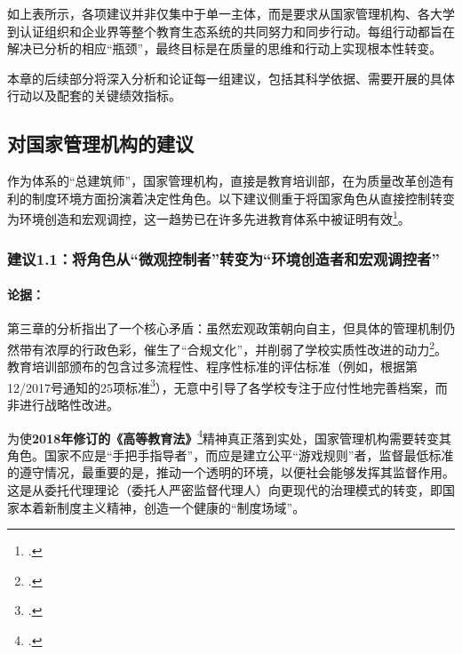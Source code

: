 \vspace{0.5cm}

如上表所示，各项建议并非仅集中于单一主体，而是要求从国家管理机构、各大学到认证组织和企业界等整个教育生态系统的共同努力和同步行动。每组行动都旨在解决已分析的相应“瓶颈”，最终目标是在质量的思维和行动上实现根本性转变。

本章的后续部分将深入分析和论证每一组建议，包括其科学依据、需要开展的具体行动以及配套的关键绩效指标。

\subsection{对国家管理机构的建议}
\label{subsec:khuyen_nghi_qlnn_detailed}

作为体系的“总建筑师”，国家管理机构，直接是教育培训部，在为质量改革创造有利的制度环境方面扮演着决定性角色。以下建议侧重于将国家角色从直接控制转变为环境创造和宏观调控，这一趋势已在许多先进教育体系中被证明有效\footcite{OECD_PolicyToAction}。

\subsubsection{建议1.1：将角色从“微观控制者”转变为“环境创造者和宏观调控者”}

\paragraph{论据：}
第三章的分析指出了一个核心矛盾：虽然宏观政策朝向自主，但具体的管理机制仍然带有浓厚的行政色彩，催生了“合规文化”，并削弱了学校实质性改进的动力\footcite{pham2021governance}。教育培训部颁布的包含过多流程性、程序性标准的评估标准（例如，根据第12/2017号通知的25项标准\footcite{tt12_2017_bgddt}），无意中引导了各学校专注于应付性地完善档案，而非进行战略性改进。

为使\textbf{2018年修订的《高等教育法》}\footcite{luatvn_gddh_2018}精神真正落到实处，国家管理机构需要转变其角色。国家不应是“手把手指导者”，而应是建立公平“游戏规则”者，监督最低标准的遵守情况，最重要的是，推动一个透明的环境，以便社会能够发挥其监督作用。这是从委托代理理论（委托人严密监督代理人）向更现代的治理模式的转变，即国家本着新制度主义精神，创造一个健康的“制度场域”。

